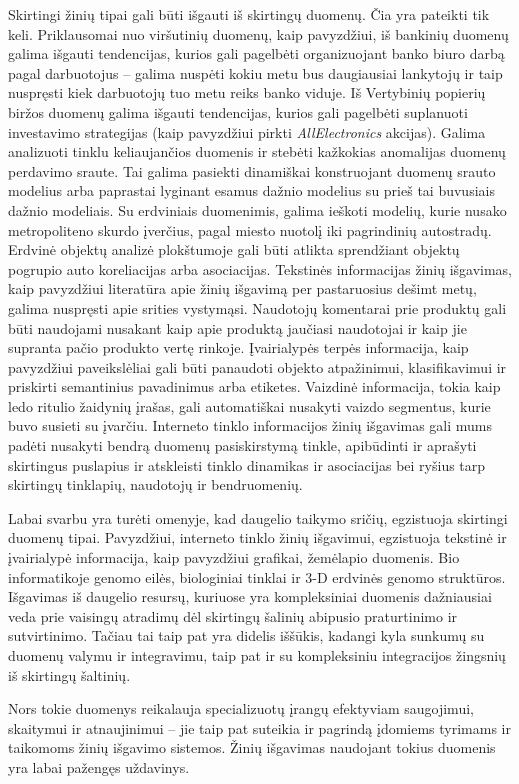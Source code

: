 Skirtingi žinių tipai gali būti išgauti iš skirtingų duomenų. 
Čia yra pateikti tik keli. 
Priklausomai nuo viršutinių duomenų, kaip pavyzdžiui, iš bankinių duomenų galima išgauti tendencijas, kurios gali pagelbėti organizuojant banko biuro darbą pagal darbuotojus -- galima nuspėti kokiu metu bus daugiausiai lankytojų ir taip nuspręsti kiek darbuotojų tuo metu reiks banko viduje.
Iš Vertybinių popierių biržos duomenų galima išgauti tendencijas, kurios gali pagelbėti suplanuoti investavimo strategijas (kaip pavyzdžiui pirkti \textit{AllElectronics} akcijas).
Galima analizuoti tinklu keliaujančios duomenis ir stebėti kažkokias anomalijas duomenų perdavimo sraute. Tai galima pasiekti dinamiškai konstruojant duomenų srauto modelius arba paprastai lyginant esamus dažnio modelius su prieš tai buvusiais dažnio modeliais.
Su erdviniais duomenimis, galima ieškoti modelių, kurie nusako metropoliteno skurdo įverčius, pagal miesto nuotolį iki pagrindinių autostradų. 
Erdvinė objektų analizė plokštumoje gali būti atlikta sprendžiant objektų pogrupio auto koreliacijas arba asociacijas. 
Tekstinės informacijas žinių išgavimas, kaip pavyzdžiui literatūra apie žinių išgavimą per pastaruosius dešimt metų, galima nuspręsti apie srities vystymąsi.
Naudotojų komentarai prie produktų gali būti naudojami nusakant kaip apie produktą jaučiasi naudotojai ir kaip jie supranta pačio produkto vertę rinkoje.
Įvairialypės terpės informacija, kaip pavyzdžiui paveikslėliai gali būti panaudoti objekto atpažinimui, klasifikavimui ir priskirti semantinius pavadinimus arba etiketes.
Vaizdinė informacija, tokia kaip ledo ritulio žaidynių įrašas, gali automatiškai nusakyti vaizdo segmentus, kurie buvo susieti su įvarčiu.
Interneto tinklo informacijos žinių išgavimas gali mums padėti nusakyti bendrą duomenų pasiskirstymą tinkle, apibūdinti ir aprašyti skirtingus puslapius ir atskleisti tinklo dinamikas ir asociacijas bei ryšius tarp skirtingų tinklapių, naudotojų ir bendruomenių.

Labai svarbu yra turėti omenyje, kad daugelio taikymo sričių, egzistuoja skirtingi duomenų tipai. 
Pavyzdžiui, interneto tinklo žinių išgavimui, egzistuoja tekstinė ir įvairialypė informacija, kaip pavyzdžiui grafikai, žemėlapio duomenis.
Bio informatikoje genomo eilės, biologiniai tinklai ir 3-D erdvinės genomo struktūros.
Išgavimas iš daugelio resursų, kuriuose yra kompleksiniai duomenis dažniausiai veda prie vaisingų atradimų dėl skirtingų šalinių abipusio praturtinimo ir sutvirtinimo.
Tačiau tai taip pat yra didelis iššūkis, kadangi kyla sunkumų su duomenų valymu ir integravimu, taip pat ir su kompleksiniu integracijos žingsnių iš skirtingų šaltinių.

Nors tokie duomenys reikalauja specializuotų įrangų efektyviam saugojimui, skaitymui ir atnaujinimui -- jie taip pat suteikia ir pagrindą įdomiems tyrimams ir taikomoms žinių išgavimo sistemos.
Žinių išgavimas naudojant tokius duomenis yra labai pažengęs uždavinys.


